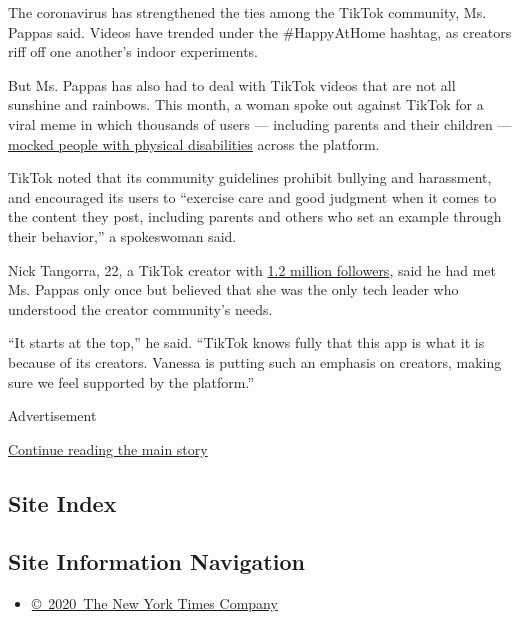 The coronavirus has strengthened the ties among the TikTok community,
Ms. Pappas said. Videos have trended under the \#HappyAtHome hashtag, as
creators riff off one another's indoor experiments.

But Ms. Pappas has also had to deal with TikTok videos that are not all
sunshine and rainbows. This month, a woman spoke out against TikTok for
a viral meme in which thousands of users --- including parents and their
children ---
\href{https://www.wbur.org/hereandnow/2020/09/07/tiktok-new-teacher-challenge-melissa-blake}{mocked
people with physical disabilities} across the platform.

TikTok noted that its community guidelines prohibit bullying and
harassment, and encouraged its users to ``exercise care and good
judgment when it comes to the content they post, including parents and
others who set an example through their behavior,'' a spokeswoman said.

Nick Tangorra, 22, a TikTok creator with
\href{https://www.tiktok.com/@nicktangorra?lang=en}{1.2 million
followers}, said he had met Ms. Pappas only once but believed that she
was the only tech leader who understood the creator community's needs.

``It starts at the top,'' he said. ``TikTok knows fully that this app is
what it is because of its creators. Vanessa is putting such an emphasis
on creators, making sure we feel supported by the platform.''

Advertisement

\protect\hyperlink{after-bottom}{Continue reading the main story}

\hypertarget{site-index}{%
\subsection{Site Index}\label{site-index}}

\hypertarget{site-information-navigation}{%
\subsection{Site Information
Navigation}\label{site-information-navigation}}

\begin{itemize}
\tightlist
\item
  \href{https://help.nytimes3xbfgragh.onion/hc/en-us/articles/115014792127-Copyright-notice}{©~2020~The
  New York Times Company}
\end{itemize}

